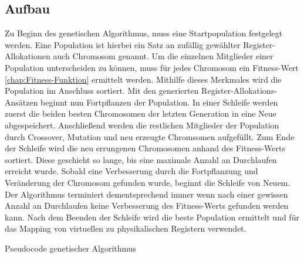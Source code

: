 \subsection{Aufbau}
\label{chap:aufbau}
Zu Beginn des genetischen Algorithmus, muss eine Startpopulation festgelegt werden. Eine Population ist hierbei ein Satz an zufällig gewählter Register-Allokationen auch Chromosom genannt. 
Um die einzelnen Mitglieder einer Population unterscheiden zu können, muss für jedes Chromosom ein Fitness-Wert \ref{chap:Fitness-Funktion} ermittelt werden. Mithilfe dieses Merkmales wird die Population im Anschluss sortiert. 
Mit den generierten Register-Allokations-Ansätzen beginnt nun Fortpflanzen der Population. In einer Schleife werden zuerst die beiden besten Chromosomen der letzten Generation in eine Neue abgespeichert. Anschließend werden die restlichen Mitglieder der Population durch Crossover, Mutation und neu erzeugte Chromsomen aufgefüllt. Zum Ende der Schleife wird die neu errungenen Chromosomen anhand des Fitness-Werts sortiert. Diese geschieht so lange, bis eine maximale Anzahl an Durchlaufen erreicht wurde. Sobald eine Verbesserung durch die Fortpflanzung und Veränderung der Chromosom gefunden wurde, beginnt die Schleife von Neuem. Der Algorithmus terminiert dementsprechend immer wenn nach einer gewissen Anzahl an Durchlaufen keine Verbesserung des Fitness-Werts gefunden werden kann. Nach dem Beenden der Schleife wird die beste Population ermittelt und für das Mapping von virtuellen zu physikalischen Registern verwendet.

\begin{algorithm}[H]
	\begin{algorithmic}[1]
%		
		
		 				
		 
	 	\ENDFOR
		\ENDFOR
		\ELSE
		\ENDIF
	\ENDWHILE
	\caption{Pseudocode genetischer Algorithmus}
\end{algorithmic}
\end{algorithm}

